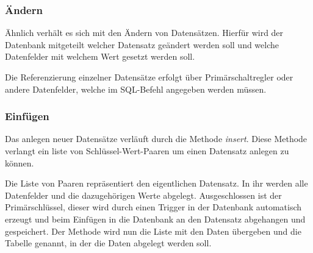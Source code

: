 \subsubsection{Ändern}
Ähnlich verhält es sich mit den Ändern von Datensätzen. Hierfür wird der Datenbank mitgeteilt welcher Datensatz geändert werden soll und welche Datenfelder mit welchem Wert gesetzt werden soll.

Die Referenzierung einzelner Datensätze erfolgt über Primärschaltregler oder andere Datenfelder, welche im SQL-Befehl angegeben werden müssen.

\subsubsection{Einfügen}
Das anlegen neuer Datensätze verläuft durch die Methode \textit{insert}. Diese Methode verlangt ein liste von Schlüssel-Wert-Paaren um einen Datensatz anlegen zu können.

Die Liste von Paaren repräsentiert den eigentlichen Datensatz. In ihr werden alle Datenfelder und die dazugehörigen Werte abgelegt. Ausgeschlossen ist der Primärschlüssel, dieser wird durch einen Trigger in der Datenbank automatisch erzeugt und beim Einfügen in die Datenbank an den Datensatz abgehangen und gespeichert. Der Methode wird nun die Liste mit den Daten übergeben und die Tabelle genannt, in der die Daten abgelegt werden soll.
